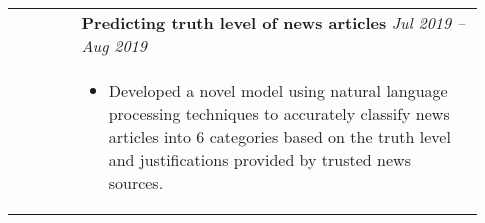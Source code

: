 \documentclass[letterpaper, 10pt, oneside]{article}
\newcommand{\bdit}[1]{{\textbf{#1}}}
\begin{document}
\begin{longtable}{@{} p{0.13\linewidth} p{0.8\linewidth}}
                                                      & \bdit{Predicting truth level of news articles} \hfill \textsl{Jul 2019 -- Aug 2019}                                                                                                                   \\
                                                      & \parbox{0.8\textwidth}{                                                                                                                                                                               %
        \begin{itemize}[leftmargin=*, itemsep=-0.88ex, topsep=0.2ex]
            \item Developed a novel model using natural language processing techniques to accurately classify news articles into 6 categories based on the truth level and justifications provided by trusted news sources.
        \end{itemize}
    }                                                                                                                                                                                                                                                         \\
    \\[-1ex]




\end{longtable}
\end{document}
